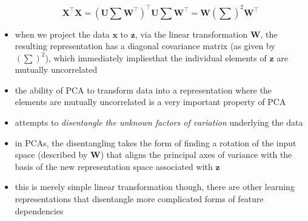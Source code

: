 \documentclass[11pt, twocolumn]{report}
\begin{document}
\begin{itemize}
\begin{equation}
      \bm{X}^\intercal\bm{X} = \left( \bm{U} \sum \bm{W}^\intercal
      \right)^\intercal \bm{U} \sum \bm{W}^\intercal = \bm{W} (\sum)^2
      \bm{W}^\intercal
    \end{equation}
  \item when we project the data $\bm{x}$ to $\bm{z}$, via the linear
    transformation $\bm{W}$, the resulting representation has a diagonal
    covariance matrix (as given by $(\sum)^2$), which immediately impliesthat
    the individual elements of $\bm{z}$ are mutually uncorrelated
  \item the ability of PCA to transform data into a representation where the
    elements are mutually uncorrelated is a very important property of PCA
  \item attempts to \textit{disentangle the unknown factors of variation}
    underlying the data
  \item in PCAs, the disentangling takes the form of finding a rotation of the
    input space (described by $\bm{W}$) that aligns the principal axes of
    variance with the basis of the new representation space associated with
    $\bm{z}$
  \item this is merely simple linear transformation though, there are other
    learning representations that disentangle more complicated forms of feature
    dependencies
\end{itemize}
\end{document}
